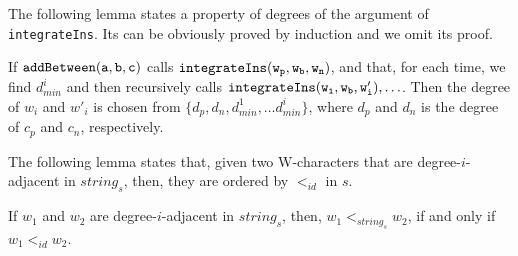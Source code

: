 The following lemma states a property of degrees of the argument of {\tt integrateIns}. Its can be obviously proved by induction and we omit its proof.

\begin{lemma}
\label{lemma:a property of degree of argument of integrateIns}
If $\alabelshort[{\tt addBetween}]{a,b,c}$ calls $\alabelshort[{\tt integrateIns}]{w_p,w_b,w_n}$, and that, for each time, we find $d_{min}^i$ and then recursively calls $\alabelshort[{\tt integrateIns}]{w_i,w_b,w'_i},\ldots$. Then the degree of $w_i$ and $w'_i$ is chosen from $\{ d_p,d_n,d_{min}^1,\ldots d_{min}^i \}$, where $d_p$ and $d_n$ is the degree of $c_p$ and $c_n$, respectively.
\end{lemma}


The following lemma states that, given two W-characters that are degree-$i$-adjacent in $string_s$, then, they are ordered by $<_{id}$ in $s$.

\begin{lemma}
\label{lemma:in strings, given two degree-i-adjacent W-characters, they are ordered by id order}
If $w_1$ and $w_2$ are degree-$i$-adjacent in $string_s$, then, $w_1 <_{string_s} w_2$, if and only if $w_1 <_{id} w_2$.
\end{lemma}

